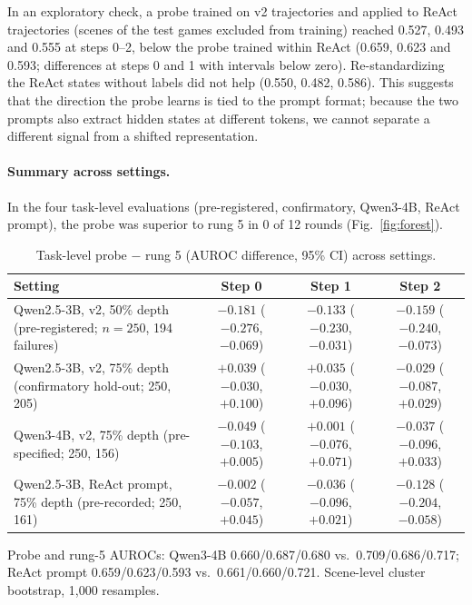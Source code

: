 \documentclass[11pt]{article}
\begin{document}
In an exploratory check, a probe trained on v2 trajectories and applied to ReAct trajectories (scenes of the test games excluded from training) reached 0.527, 0.493 and 0.555 at steps 0--2,
below the probe trained within ReAct (0.659, 0.623 and 0.593; differences at steps 0 and 1 with intervals below zero). Re-standardizing the ReAct states without labels did not help (0.550, 0.482, 0.586).
This suggests that the direction the probe learns is tied to the prompt format; because the two prompts also extract hidden states at different tokens, we cannot separate a different signal from a shifted representation.

\paragraph{Summary across settings.} In the four task-level evaluations (pre-registered, confirmatory, Qwen3-4B, ReAct prompt), the probe was superior to rung 5 in 0 of 12 rounds (Fig.~\ref{fig:forest}).

\begin{table}[t]
\centering\small
\caption{Task-level probe $-$ rung 5 (AUROC difference, 95\% CI) across settings.}\label{tab:settings}
\begin{tabularx}{\linewidth}{@{}Lccc@{}}
\toprule
Setting & Step 0 & Step 1 & Step 2 \\
\midrule
Qwen2.5-3B, v2, 50\% depth (pre-registered; $n = 250$, 194 failures) & $-0.181$ ($-0.276$, $-0.069$) & $-0.133$ ($-0.230$, $-0.031$) & $-0.159$ ($-0.240$, $-0.073$) \\
Qwen2.5-3B, v2, 75\% depth (confirmatory hold-out; 250, 205) & $+0.039$ ($-0.030$, $+0.100$) & $+0.035$ ($-0.030$, $+0.096$) & $-0.029$ ($-0.087$, $+0.029$) \\
Qwen3-4B, v2, 75\% depth (pre-specified; 250, 156) & $-0.049$ ($-0.103$, $+0.005$) & $+0.001$ ($-0.076$, $+0.071$) & $-0.037$ ($-0.096$, $+0.033$) \\
Qwen2.5-3B, ReAct prompt, 75\% depth (pre-recorded; 250, 161) & $-0.002$ ($-0.057$, $+0.045$) & $-0.036$ ($-0.096$, $+0.021$) & $-0.128$ ($-0.204$, $-0.058$) \\
\bottomrule
\end{tabularx}
\par\smallskip\raggedright\footnotesize
Probe and rung-5 AUROCs: Qwen3-4B 0.660/0.687/0.680 vs.\ 0.709/0.686/0.717; ReAct prompt 0.659/0.623/0.593 vs.\ 0.661/0.660/0.721. Scene-level cluster bootstrap, 1,000 resamples.
\end{table}
\end{document}
